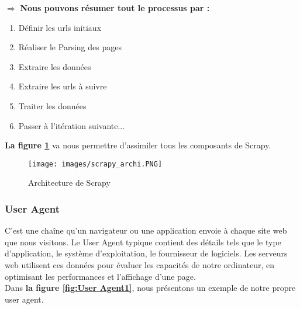 $\Rightarrow$ \textbf{Nous pouvons résumer tout le processus par :}
\begin{enumerate}
    \item Définir les urls initiaux
    \item Réaliser le Parsing des pages
    \item Extraire les données
    \item Extraire les urls à suivre
    \item Traiter les données
    \item Passer à l'itération suivante...
\end{enumerate}
\textbf{La figure \ref{fig:Architecture de Scrapy}} va nous permettre d’assimiler tous les composants de Scrapy.

\begin{figure}[H]
            \centering
            \texttt{[image: images/scrapy\_archi.PNG]}
            \caption{Architecture de Scrapy \cite{architect}}
            \label{fig:Architecture de Scrapy}  
        \end{figure}

\subsubsection{User Agent}
C'est une chaîne qu'un navigateur ou une application envoie à chaque site web que nous visitons. Le User Agent typique contient des détails tels que le type d'application, le système d'exploitation, le fournisseur de logiciels. Les serveurs web utilisent ces données pour évaluer les capacités de notre ordinateur, en optimisant les performances et l'affichage d'une page.\\

\noindent Dans \textbf{la figure \ref{fig:User Agent1}}, nous présentons un exemple de notre propre user agent.

